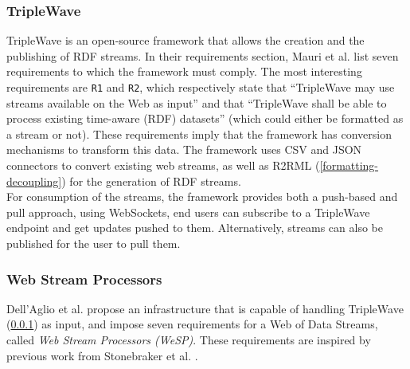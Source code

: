 \subsubsection{TripleWave}\label{sssec:streaming-rdfsp-triplewave}
TripleWave is an open-source framework that allows the creation and the publishing of RDF streams. In their requirements section, Mauri et al. \cite{mauri2016triplewave} list seven requirements to which the framework must comply. The most interesting requirements are \texttt{R1} and \texttt{R2}, which respectively state that ``TripleWave may use streams available on the Web as input'' and that ``TripleWave shall be able to process existing time-aware (RDF) datasets'' (which could either be formatted as a stream or not). These requirements imply that the framework has conversion mechanisms to transform this data. The framework uses CSV and JSON connectors to convert existing web streams, as well as R2RML (\cref{formatting-decoupling}) for the generation of RDF streams.\\

\noindent For consumption of the streams, the framework provides both a push-based and pull approach, using WebSockets, end users can subscribe to a TripleWave endpoint and get updates pushed to them. Alternatively, streams can also be published for the user to pull them.

\subsubsection{Web Stream Processors}
Dell'Aglio et al. \cite{webofdatastreams} propose an infrastructure that is capable of handling TripleWave (\cref{sssec:streaming-rdfsp-triplewave}) as input, and impose seven requirements for a Web of Data Streams, called \emph{Web Stream Processors (WeSP)}. These requirements are inspired by previous work from Stonebraker et al. \cite{10.1145/1107499.1107504}.

